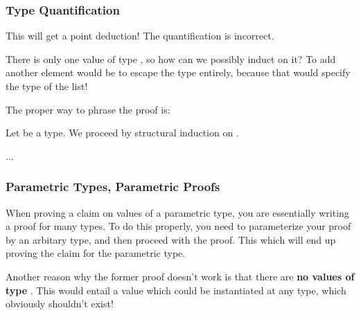 \documentclass[aspectratio=169, handout]{beamer}
\begin{document}
\begin{frame}[fragile]
  \frametitle{Type Quantification}

  This will get a point deduction! The quantification is incorrect.

  \pause
  \vspace{\fill}

  There is only one value of type , so how can we possibly induct 
  on it? To add another element would be to escape the type entirely, because
  that would specify the type of the list!

  \pause
  \vspace{\fill}

  The proper way to phrase the proof is:

  \pause
  \vspace{\fill}

  Let  be a type. We proceed by structural induction on .

  \vspace{\fill}

  ...

  \vspace{\fill}

\end{frame}

\begin{frame}[fragile]
  \frametitle{Parametric Types, Parametric Proofs}

  When proving a claim on values of a parametric type, you are essentially writing
  a proof for many types. To do this properly, you need to parameterize your proof
  by an arbitary type, and then proceed with the proof. This which will end up 
  proving the claim for the parametric type. 

  \pause
  \vspace{\fill}

  Another reason why the former proof doesn't work is that there are 
  \textbf{no values of type }. This would entail a value which could
  be instantiated at any type, which obviously shouldn't exist!
\end{frame}
\end{document}
